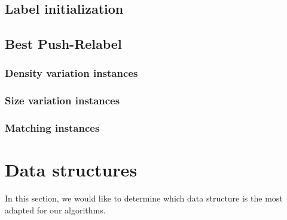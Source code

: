 \subsection{Label initialization}
\subsection{Best Push-Relabel}
\subsubsection{Density variation instances}
\subsubsection{Size variation instances}
\subsubsection{Matching instances}

\section{Data structures}
In this section, we would like to determine which data structure is the most adapted for our algorithms.
